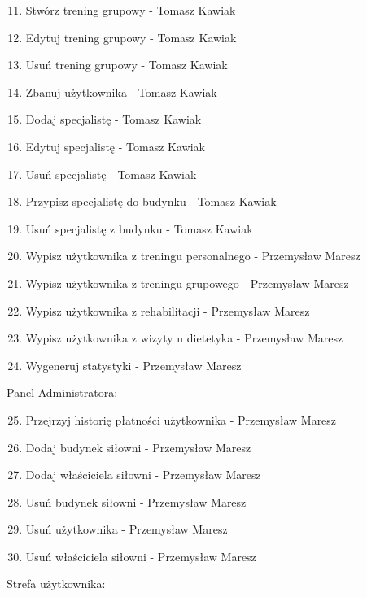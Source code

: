 \begin{enumerate}
\setcounter{enumi}{10}
\tightlist
\item
  {Stwórz trening grupowy - Tomasz Kawiak}
\item
  {Edytuj trening grupowy - Tomasz Kawiak}
\item
  {Usuń trening grupowy - Tomasz Kawiak}
\item
  {Zbanuj użytkownika - Tomasz Kawiak}
\item
  {Dodaj specjalistę - Tomasz Kawiak}
\item
  {Edytuj specjalistę - Tomasz Kawiak}
\item
  {Usuń specjalistę - Tomasz Kawiak}
\item
  {Przypisz specjalistę do budynku - Tomasz Kawiak}
\item
  {Usuń specjalistę z budynku - Tomasz Kawiak}
\item
  {Wypisz użytkownika z treningu personalnego - Przemysław Maresz}
\item
  {Wypisz użytkownika z treningu grupowego - Przemysław Maresz}
\item
  {Wypisz użytkownika z rehabilitacji - Przemysław Maresz}
\item
  {Wypisz użytkownika z wizyty u dietetyka - Przemysław Maresz}
\item
  {Wygeneruj statystyki - Przemysław Maresz}
\end{enumerate}

{Panel Administratora:}

\begin{enumerate}
\setcounter{enumi}{24}
\tightlist
\item
  {Przejrzyj historię płatności użytkownika - Przemysław Maresz}
\item
  {Dodaj budynek siłowni - Przemysław Maresz}
\item
  {Dodaj właściciela siłowni - Przemysław Maresz}
\item
  {Usuń budynek siłowni - Przemysław Maresz}
\item
  {Usuń użytkownika - Przemysław Maresz}
\item
  {Usuń właściciela siłowni - Przemysław Maresz}
\end{enumerate}

{Strefa użytkownika:}

